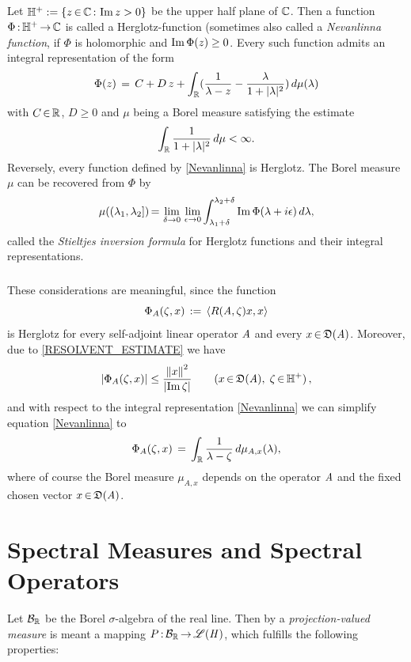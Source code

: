 \documentclass[11pt,twoside]{article}
\begin{document}
\subparagraph{}
Let ${\mathbb{H}}^+ := \{z {\,\in\,} {\mathbb{C}} {\,:\,} \operatorname{Im} z > 0\}$ be the upper half plane of ${\mathbb{C}}$.
Then a function $\Phi {\,:\,} {\mathbb{H}}^+ {\,\to\,} {\mathbb{C}}$ is called a {Herglotz-function}
(sometimes also called a \textit{Nevanlinna function},
if $\Phi$ is holomorphic and $\operatorname{Im} \Phi(z) \geq 0$.
Every such function admits an integral representation of the form
\begin{equation}\label{Nevanlinna}
\Phi(z) \= C + D\,z +
\int_{\R} (\frac{1}{\lambda-z} -\frac{\lambda}{1+\abs{\lambda} ^2}) \, d\mu(\lambda)
\end{equation}
with $C {\,\in\,} {\mathbb{R}}$, $D \geq 0$ and $\mu$ being a Borel measure satisfying the estimate
\[
\int_{\R} \frac{1}{1+\abs{\lambda} ^2} \,d\mu < \infty.
\]
Reversely,
every function defined by \eqref{Nevanlinna} is Herglotz.
The Borel measure $\mu$ can be recovered from $\Phi$ by
\begin{equation}\label{INVERSION_FORMULA}
\mu((\lambda_1,\lambda_2]) {\,=\,} \lim_{\delta \to 0} \, \lim_{\epsilon \to 0}
\int_{\lambda_1+\delta}^{\lambda_2+\delta}
\operatorname{Im} \Phi(\lambda + i \epsilon) \, d\lambda,
\end{equation}
called the \textit{Stieltjes inversion formula} for Herglotz functions
and their integral representations.

\subparagraph{}
These considerations are meaningful,
since the function
\[
\Phi_A(\zeta,x) \,:=\, \langle R(\mathit{A},\zeta)x,x \rangle
\]
is Herglotz for every self-adjoint linear operator $\mathit{A}$
and every $x {\,\in\,} \mathfrak{D}(\mathit{A})$.
Moreover, due to \eqref{RESOLVENT_ESTIMATE} we have
\[
\abs{\Phi_A(\zeta,x)} \leq \frac{\norm{x}^2}{\abs{\im \zeta} }
\quad \quad (x \xeof \domain{\linA}, \; \zeta \xeof \H^+)\,,
\]
and with respect to the integral representation \eqref{Nevanlinna}
we can simplify equation \eqref{Nevanlinna} to
\begin{equation}\label{Nevanlinna_2}
\Phi_A(\zeta,x) \,=\,
\int_{{\mathbb{R}}} \frac{1}{\lambda-\zeta} \, d\mu_{A,x}(\lambda),
\end{equation}
where of course the Borel measure $\mu_{A,x}$ depends on the operator $\mathit{A}$
and the fixed chosen vector $x {\,\in\,} \mathfrak{D}(\mathit{A})$.

\section{Spectral Measures and Spectral Operators}                             %
Let ${\mathcal{B}}_{{\mathbb{R}}}$ be the Borel $\sigma$-algebra of the real line.
Then by a \textit{projection-valued measure}
is meant a mapping $P {\,:\,} {\mathcal{B}}_{{\mathbb{R}}} {\,\to\,} \mathscr{L}(\mathit{H})$,
which fulfills the following properties:
\end{document}
